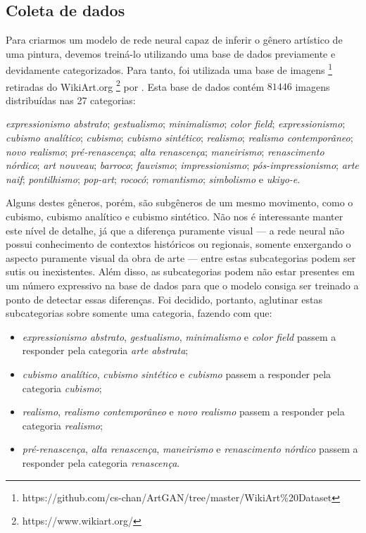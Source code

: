 \documentclass[12pt, a4paper]{article}
\begin{document}
\subsection{Coleta de dados}
Para criarmos um modelo de rede neural capaz de inferir o gênero artístico de uma pintura, devemos treiná-lo utilizando uma base de dados previamente e devidamente categorizados. Para tanto, foi utilizada uma base de imagens \footnote{https://github.com/cs-chan/ArtGAN/tree/master/WikiArt\%20Dataset} retiradas do WikiArt.org \footnote{https://www.wikiart.org/} por \cite{icip2016}. Esta base de dados contém $81446$ imagens distribuídas nas 27 categorias: 

\emph{expressionismo abstrato}; 
\emph{gestualismo}; 
\emph{minimalismo}; 
\emph{color field}; 
\emph{expressionismo}; 
\emph{cubismo analítico}; 
\emph{cubismo}; 
\emph{cubismo sintético}; 
\emph{realismo}; 
\emph{realismo contemporâneo}; 
\emph{novo realismo}; 
\emph{pré-renascença}; 
\emph{alta renascença}; 
\emph{maneirismo}; 
\emph{renascimento nórdico}; 
\emph{art nouveau}; 
\emph{barroco}; 
\emph{fauvismo}; 
\emph{impressionismo}; 
\emph{pós-impressionismo}; 
\emph{arte naif}; 
\emph{pontilhismo}; 
\emph{pop-art}; 
\emph{rococó}; 
\emph{romantismo}; 
\emph{simbolismo} e
\emph{ukiyo-e}.

Alguns destes gêneros, porém, são subgêneros de um mesmo movimento, como o cubismo, cubismo analítico e cubismo sintético. Não nos é interessante manter este nível de detalhe, já que a diferença puramente visual --- a rede neural não possui conhecimento de contextos históricos ou regionais, somente enxergando o aspecto puramente visual da obra de arte --- entre estas subcategorias podem ser sutis ou inexistentes. Além disso, as subcategorias podem não estar presentes em um número expressivo na base de dados para que o modelo consiga ser treinado a ponto de detectar essas diferenças. Foi decidido, portanto, aglutinar estas subcategorias sobre somente uma categoria, fazendo com que:

\begin{itemize}
\item \emph{expressionismo abstrato}, \emph{gestualismo}, \emph{minimalismo} e \emph{color field} passem a responder pela categoria \emph{arte abstrata};
\item \emph{cubismo analítico}, \emph{cubismo sintético} e \emph{cubismo} passem a responder pela categoria \emph{cubismo};
\item \emph{realismo}, \emph{realismo contemporâneo} e \emph{novo realismo} passem a responder pela categoria \emph{realismo};
\item \emph{pré-renascença}, \emph{alta renascença}, \emph{maneirismo} e \emph{renascimento nórdico} passem a responder pela categoria \emph{renascença}.
\end{itemize}
\end{document}
